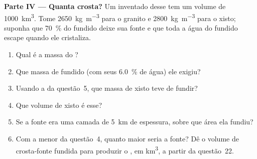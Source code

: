 \begin{problem}
\noindent\textbf{Parte IV --- Quanta crosta?}
Um  inventado desse  tem um volume de \qty{1000}{\cubic\kilo\metre}.
Tome \qty{2650}{\kilogram\per\cubic\metre} para o granito e
\qty{2800}{\kilogram\per\cubic\metre} para o xisto; suponha que \qty{70}{\percent} do
fundido deixe sua fonte e que toda a água do fundido escape quando ele cristaliza.
\begin{enumerate}[resume]
\item Qual é a massa do ?
\item Que massa de fundido (com seus \qty{6.0}{\percent} de água) ele exigiu?
\item Usando a  da questão~5, que massa de xisto teve de fundir?
\item Que volume de xisto é esse?
\item Se a fonte era uma camada de \qty{5}{km} de espessura, sobre que área ela fundiu?
\item Com a menor  da questão~4, quanto maior seria a
fonte? Dê o volume de crosta-fonte fundida para produzir o , em
\unit{\cubic\kilo\metre}, a partir da questão~22.
\end{enumerate}
\end{problem}
